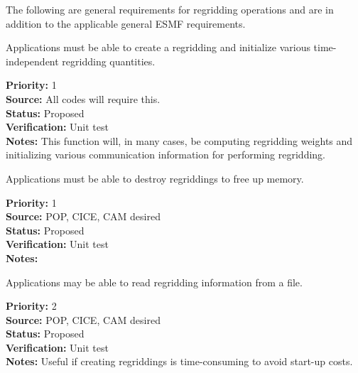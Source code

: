 

The following are general requirements for regridding operations and are in
addition to the applicable general ESMF requirements.


Applications must be able to create a regridding and initialize
various time-independent regridding quantities.

\begin{reqlist}
{\bf Priority:} 1 \\
{\bf Source:} All codes will require this. \\
{\bf Status:} Proposed \\
{\bf Verification:} Unit test \\
{\bf Notes:} This function will, in many cases, be computing
             regridding weights and initializing various
             communication information for performing regridding.
\end{reqlist}


Applications must be able to destroy regriddings to free up memory.

\begin{reqlist}
{\bf Priority:} 1 \\
{\bf Source:} POP, CICE, CAM desired \\
{\bf Status:} Proposed \\
{\bf Verification:} Unit test \\
{\bf Notes:} 
\end{reqlist}


Applications may be able to read regridding information from a file.

\begin{reqlist}
{\bf Priority:} 2 \\
{\bf Source:} POP, CICE, CAM desired \\
{\bf Status:} Proposed \\
{\bf Verification:} Unit test \\
{\bf Notes:} Useful if creating regriddings is time-consuming to avoid
             start-up costs.
\end{reqlist}


